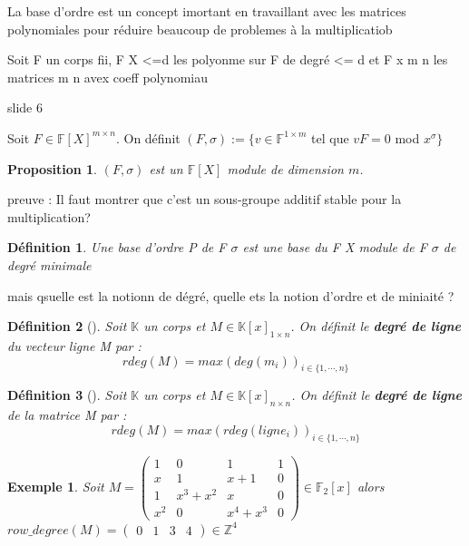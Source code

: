 \documentclass[a4paper,12pt]{report}  %
\theoremstyle{definitionstyle}
\newtheorem{definition}{Définition}[chapter] %
\theoremstyle{examplestyle}
\newtheorem{example}{Exemple}[chapter] %
\theoremstyle{remarkstyle}
\theoremstyle{propositionstyle}
\newtheorem{proposition}{Proposition}[chapter]  %
\theoremstyle{theoremstyle}
\begin{document}
	
	La base d'ordre est un concept imortant en travaillant avec les matrices polynomiales pour réduire beaucoup de problemes à la multiplicatiob
	
	Soit F un corps fii, F X <=d les polyonme sur F de degré <= d et F x m n les matrices m n avex coeff polynomiau
	
	slide 6
	
	
	Soit $F \in \mathbb{F}[X]^{m \times n}$. On définit $(F, \sigma):= \{v \in \mathbb{F}^{1 \times m}$ tel que $ vF = 0$ mod $x^\sigma\}$
	
	\begin{proposition}
		$(F, \sigma)$ est un $\mathbb{F}[X]$ module de dimension $m$.
	\end{proposition}

	preuve : Il faut montrer que c'est un sous-groupe additif stable pour la multiplication?
	
	
	\begin{definition}
		Une base d'ordre P de F $\sigma$
		 est une base du F X module de F $\sigma$ de degré minimale
	\end{definition}
	
	mais qsuelle est la notionn de dégré, quelle ets la notion d'ordre et de miniaité ?
	
	
	\begin{definition}[\cite{clef_unique_0}]
		Soit $\mathbb{K}$ un corps et $M \in \mathbb{K}[x]_{1 \times n}$. On définit le \textbf{degré de ligne} du vecteur ligne M par : 
		$$rdeg(M)=max(deg(m_i))_{i\in\{1, \cdots, n\}}$$
	\end{definition}
	
	\begin{definition}[\cite{clef_unique_0}]
		Soit $\mathbb{K}$ un corps et $M \in \mathbb{K}[x]_{n \times n}$. On définit le \textbf{degré de ligne} de la matrice M par :
		$$rdeg(M)=max(rdeg(ligne_i))_{i\in\{1, \cdots, n\}}$$
	\end{definition}
	
	\begin{example}
		Soit $M =
		\left(\begin{array}{rrrr}
			1 & 0 & 1 & 1 \\
			x & 1 & x + 1 & 0 \\
			1 & x^{3} + x^{2} & x & 0 \\
			x^{2} & 0 & x^{4} + x^{3} & 0
		\end{array}\right) \in \mathbb{F}_2[x]
		$
		alors $row\_degree(M)=\left(\begin{array}{rrrr}
			0 & 1 & 3 & 4
		\end{array}\right)\in \mathbb{Z}^4$
		
	\end{example}
	
\end{document}
